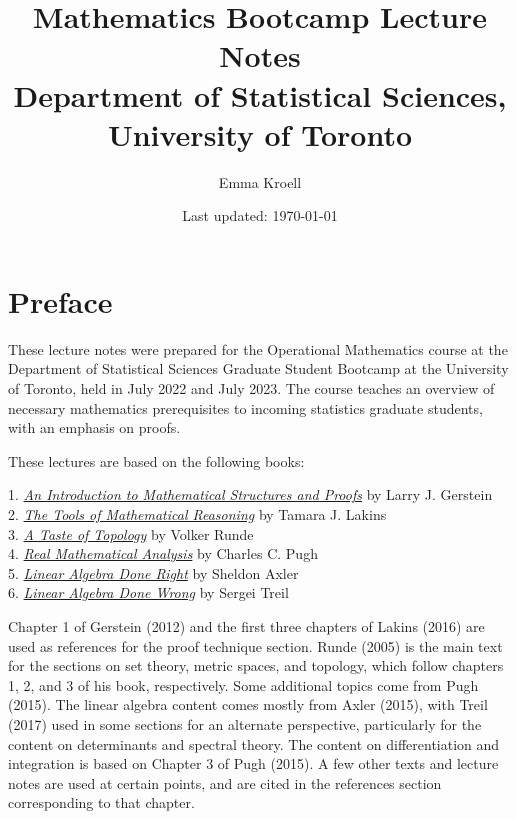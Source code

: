 \documentclass{article}
\title{Mathematics Bootcamp Lecture Notes \\
\vspace{0.5em}
\large Department of Statistical Sciences, University of Toronto}
\author{Emma Kroell}
\date{Last updated: \today}
\begin{document}
\maketitle


\newpage
\section*{Preface}

These lecture notes were prepared for the Operational Mathematics course at the Department of Statistical Sciences Graduate Student Bootcamp at the University of Toronto, held in July 2022 and July 2023. The course teaches an overview of necessary mathematics prerequisites to incoming statistics graduate students, with an emphasis on proofs.


These lectures are based on the following books:

1. \href{https://link-springer-com.myaccess.library.utoronto.ca/book/10.1007/978-1-4614-4265-3}{{\emph{An Introduction to Mathematical Structures and Proofs}}} by Larry J. Gerstein \\
2. \href{https://bookstore.ams.org/amstext-26/}{{\emph{The Tools of Mathematical Reasoning}}} by Tamara J. Lakins \\
3. \href{https://link-springer-com.myaccess.library.utoronto.ca/book/10.1007/0-387-28387-0}{\emph{A Taste of Topology}} by Volker Runde \\
4. \href{https://link-springer-com.myaccess.library.utoronto.ca/book/10.1007/978-3-319-17771-7}{\emph{Real Mathematical Analysis}} by Charles C. Pugh \\
5. \href{https://link-springer-com.myaccess.library.utoronto.ca/book/10.1007/978-3-319-11080-6}{{\emph{Linear Algebra Done Right}}} by Sheldon Axler \\
6. \href{https://www.math.brown.edu/streil/papers/LADW/LADW.html}{{\emph{Linear Algebra Done Wrong}}} by Sergei Treil 

Chapter 1 of Gerstein (2012) and the first three chapters of Lakins (2016) are used as references for the proof technique section. Runde (2005) is the main text for the sections on set theory, metric spaces, and topology, which follow chapters 1, 2, and 3 of his book, respectively. Some additional topics come from Pugh (2015). The linear algebra content comes mostly from Axler (2015), with Treil (2017) used in some sections for an alternate perspective, particularly for the content on determinants and spectral theory. The content on differentiation and integration is based on Chapter 3 of Pugh (2015). A few other texts and lecture notes are used at certain points, and are cited in the references section corresponding to that chapter.
\end{document}
